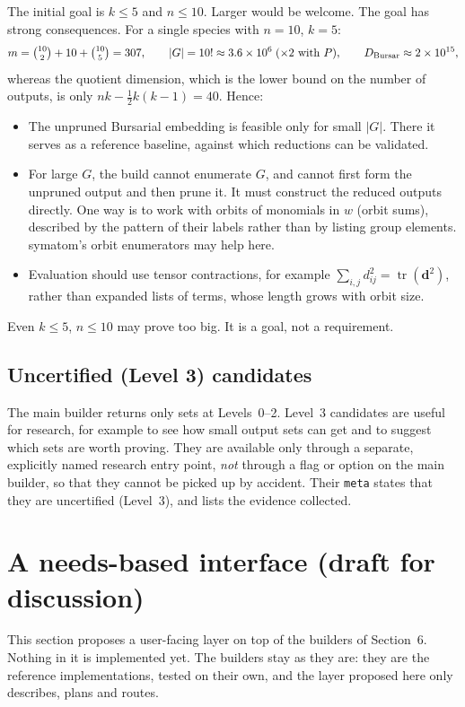 \documentclass[11pt]{article}
\theoremstyle{definition}
\theoremstyle{remark}
\begin{document}
The initial goal is $k \le 5$ and $n \le 10$. Larger would be welcome. The
goal has strong consequences. For a single species with $n = 10$, $k = 5$:
\[
  m = \tbinom{10}{2} + 10 + \tbinom{10}{5} = 307, \qquad
  |G| = 10! \approx 3.6 \times 10^6 \;(\times 2 \text{ with } P), \qquad
  D_{\text{Bursar}} \approx 2 \times 10^{15},
\]
whereas the quotient dimension, which is the lower bound on the number of
outputs, is only $nk - \tfrac{1}{2}k(k-1) = 40$. Hence:
\begin{itemize}
  \item The unpruned Bursarial embedding is feasible only for small $|G|$.
    There it serves as a reference baseline, against which reductions can be
    validated.
  \item For large $G$, the build cannot enumerate $G$, and cannot first form
    the unpruned output and then prune it. It must construct the reduced
    outputs directly. One way is to work with orbits of monomials in $w$
    (orbit sums), described by the pattern of their labels rather than by
    listing group elements. symatom's orbit enumerators may help here.
  \item Evaluation should use tensor contractions, for example
    $\sum_{i,j} d_{ij}^2 = \operatorname{tr}(\mathbf{d}^2)$, rather than
    expanded lists of terms, whose length grows with orbit size.
\end{itemize}
Even $k \le 5$, $n \le 10$ may prove too big. It is a goal, not a
requirement.

\subsection{Uncertified (Level 3) candidates}

The main builder returns only sets at Levels~0--2. Level~3 candidates are
useful for research, for example to see how small output sets can get and to
suggest which sets are worth proving. They are available only through a
separate, explicitly named research entry point, \emph{not} through a flag
or option on the main builder, so that they cannot be picked up by accident.
Their \texttt{meta} states that they are uncertified (Level~3), and lists the
evidence collected.

\section{A needs-based interface (draft for discussion)}\label{sec:needs}

This section proposes a user-facing layer on top of the builders of
Section~6. Nothing in it is implemented yet. The builders stay as they are:
they are the reference implementations, tested on their own, and the layer
proposed here only describes, plans and routes.
\end{document}
